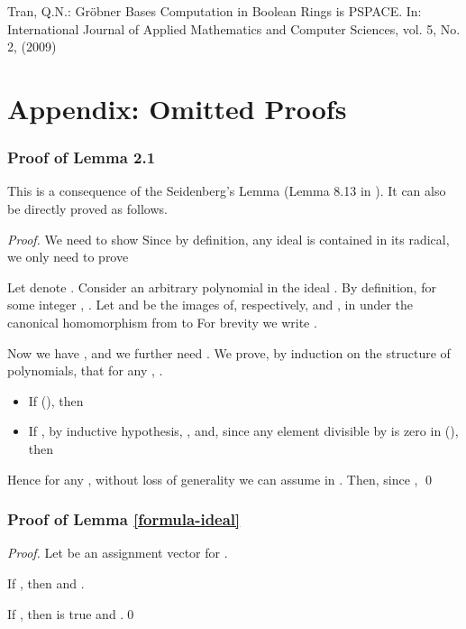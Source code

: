 \documentclass[envcountsect]{llncs}
\begin{document}
{{\begin{thebibliography}{20}
 Tran, Q.N.: Gr\"obner Bases Computation in Boolean Rings is PSPACE. In: International Journal of Applied Mathematics and Computer Sciences, vol. 5, No. 2, (2009)

\end{thebibliography}

\newpage

\section*{Appendix: Omitted Proofs}

\subsubsection{Proof of Lemma 2.1}

This is a consequence of the Seidenberg's Lemma (Lemma 8.13 in \cite{grobnerbook}). It can also be directly proved as follows.
\begin{proof}
We need to show  Since by definition, any ideal is contained in its
radical, we only need to prove 

Let  denote . Consider an arbitrary polynomial  in the ideal . By definition, for some integer , . Let  and  be the images of,
respectively,  and , in  under the
canonical homomorphism from  to  For brevity we write .

Now we have , and we further need . We prove, by induction on the structure of polynomials, that for any , .  
\begin{itemize}
\item If  (), then

\item If , by inductive hypothesis, , and,
since any element divisible by  is zero in  (), then

\end{itemize}
Hence  for any , without loss of generality
we can assume  in . Then, since , \qed
\end{proof}




\subsubsection{Proof of Lemma \ref{formula-ideal}}
\begin{proof}
Let  be an assignment vector for .

If , then  and . 

If , then  is true and .\qed
\end{proof}

}}
\end{document}
